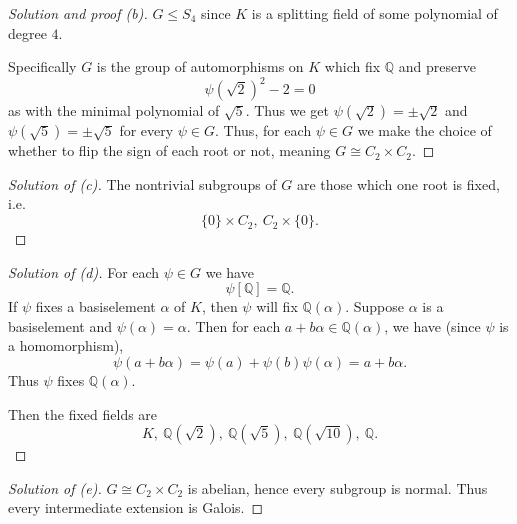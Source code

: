 \begin{proof}[Solution and proof (b)]
    $G \leq S_4$ since $K$ is a splitting 
    field of some polynomial of degree $4$.  

    Specifically $G$ is the group of 
    automorphisms on $K$ which fix $\mathbb Q$ 
    and preserve 
    \[
        \psi(\sqrt 2)^2 - 2 = 0
    \]
    as with the minimal polynomial of 
    $\sqrt 5$. Thus we get 
    $\psi(\sqrt 2) = \pm \sqrt 2$ and 
    $\psi(\sqrt 5) = \pm \sqrt 5$ for 
    every $\psi \in G$.
    Thus, for each $\psi \in G$ we make 
    the choice of whether to flip the sign 
    of each root or not, meaning 
    $G \cong C_2 \times C_2$. 
\end{proof}

\begin{proof}[Solution of (c)]
    The nontrivial subgroups of $G$ are those which 
    one root is fixed, i.e. 
    \[
        \{0\} \times C_2, \ 
        C_2 \times \{0\}.
    \]
\end{proof}

\begin{proof}[Solution of (d)]
    For each $\psi \in G$ we have 
    \[
        \psi[\mathbb Q] = \mathbb Q.
    \]
    If $\psi$ fixes a basiselement $\alpha$ of 
    $K$, then $\psi$ will fix $\mathbb Q(\alpha)$. 
    Suppose $\alpha$ is a basiselement and 
    $\psi(\alpha) = \alpha$. Then 
    for each $a + b\alpha \in \mathbb Q(\alpha)$, we have 
    (since $\psi$ is a homomorphism), 
    \[
        \psi(a + b\alpha) 
        = \psi(a) + \psi(b)\psi(\alpha) 
        = a + b\alpha.
    \]
    Thus $\psi$ fixes $\mathbb Q(\alpha)$. 

    Then the fixed fields are 
    \[
        K, \ \mathbb Q(\sqrt 2), \
        \mathbb Q(\sqrt 5), \
        \mathbb Q(\sqrt{10}), \
        \mathbb Q.
    \]
\end{proof}
\begin{proof}[Solution of (e)]
    $G \cong C_2 \times C_2$ is abelian, hence 
    every subgroup is normal. Thus every 
    intermediate extension is Galois.
\end{proof}


